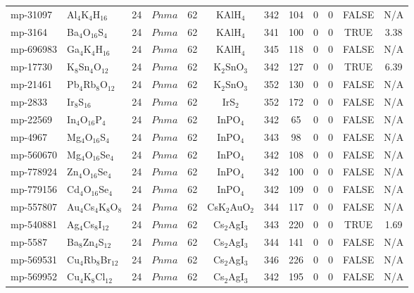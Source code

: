 {\begin{longtable}{llcccccccccc}
    mp-31097 & Al$_{4}$K$_{4}$H$_{16}$ & 24    & $Pnma$ & 62    & KAlH$_{4}$ & 342   & 104   & 0     & 0     & FALSE & N/A \\
    mp-3164 & Ba$_{4}$O$_{16}$S$_{4}$ & 24    & $Pnma$ & 62    & KAlH$_{4}$ & 341   & 100   & 0     & 0     & TRUE  & 3.38  \\
    mp-696983 & Ga$_{4}$K$_{4}$H$_{16}$ & 24    & $Pnma$ & 62    & KAlH$_{4}$ & 345   & 118   & 0     & 0     & FALSE & N/A \\
    mp-17730 & K$_{8}$Sn$_{4}$O$_{12}$ & 24    & $Pnma$ & 62    & K$_{2}$SnO$_{3}$ & 342   & 127   & 0     & 0     & TRUE  & 6.39  \\
    mp-21461 & Pb$_{4}$Rb$_{8}$O$_{12}$ & 24    & $Pnma$ & 62    & K$_{2}$SnO$_{3}$ & 352   & 130   & 0     & 0     & FALSE & N/A \\
    mp-2833 & Ir$_{8}$S$_{16}$ & 24    & $Pnma$ & 62    & IrS$_{2}$ & 352   & 172   & 0     & 0     & FALSE & N/A \\
    mp-22569 & In$_{4}$O$_{16}$P$_{4}$ & 24    & $Pnma$ & 62    & InPO$_{4}$ & 342   & 65    & 0     & 0     & FALSE & N/A \\
    mp-4967 & Mg$_{4}$O$_{16}$S$_{4}$ & 24    & $Pnma$ & 62    & InPO$_{4}$ & 343   & 98    & 0     & 0     & FALSE & N/A \\
    mp-560670 & Mg$_{4}$O$_{16}$Se$_{4}$ & 24    & $Pnma$ & 62    & InPO$_{4}$ & 342   & 108   & 0     & 0     & FALSE & N/A \\
    mp-778924 & Zn$_{4}$O$_{16}$Se$_{4}$ & 24    & $Pnma$ & 62    & InPO$_{4}$ & 342   & 100   & 0     & 0     & FALSE & N/A \\
    mp-779156 & Cd$_{4}$O$_{16}$Se$_{4}$ & 24    & $Pnma$ & 62    & InPO$_{4}$ & 342   & 109   & 0     & 0     & FALSE & N/A \\
    mp-557807 & Au$_{4}$Cs$_{4}$K$_{8}$O$_{8}$ & 24    & $Pnma$ & 62    & CsK$_{2}$AuO$_{2}$ & 344   & 117   & 0     & 0     & FALSE & N/A \\
    mp-540881 & Ag$_{4}$Cs$_{8}$I$_{12}$ & 24    & $Pnma$ & 62    & Cs$_{2}$AgI$_{3}$ & 343   & 220   & 0     & 0     & TRUE  & 1.69  \\
    mp-5587 & Ba$_{8}$Zn$_{4}$S$_{12}$ & 24    & $Pnma$ & 62    & Cs$_{2}$AgI$_{3}$ & 344   & 141   & 0     & 0     & FALSE & N/A \\
    mp-569531 & Cu$_{4}$Rb$_{8}$Br$_{12}$ & 24    & $Pnma$ & 62    & Cs$_{2}$AgI$_{3}$ & 346   & 226   & 0     & 0     & FALSE & N/A \\
    mp-569952 & Cu$_{4}$K$_{8}$Cl$_{12}$ & 24    & $Pnma$ & 62    & Cs$_{2}$AgI$_{3}$ & 342   & 195   & 0     & 0     & FALSE & N/A \\

\end{longtable}}
